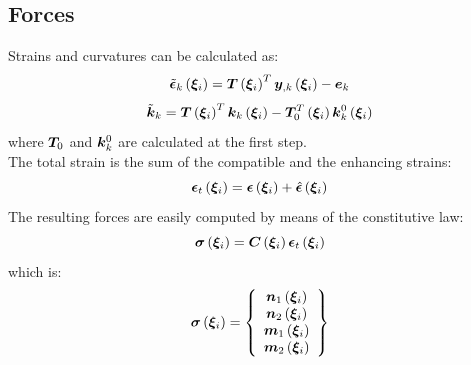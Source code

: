 \subsection{Forces}
Strains and curvatures can be calculated as:
\begin{equation}
\tilde{\T{\epsilon}}_k \valxii  =
\TT{T} \valxii ^T \T{y}_{,k} \valxii - \T{e}_k
\end{equation}
\begin{equation}
\tilde{\T{k}}_k  =
\TT{T} \valxii ^ T \T{k}_k \valxii - \TT{T}_0 ^ T \valxii \T{k}^{0}_{k} \valxii
\end{equation}
where $\TT{T}_0$ and $\T{k}^{0}_{k}$ are calculated at the first step.\\
The total strain is the sum of the compatible and the enhancing strains:
\begin{equation}
\T{\epsilon}_t \valxii =
\T{\epsilon} \valxii +
\hat{ \T{\epsilon} } \valxii
\end{equation}
The resulting forces are easily computed by means of the constitutive law:
\begin{equation}
\T{\sigma} \valxii =
\TT{C}\valxii \T{\epsilon}_t \valxii
\end{equation}
which is:
\begin{equation}
\T{\sigma} \valxii =
\cubr{\vvect{c}{
\T{n}_1 \valxii \\
\T{n}_2 \valxii \\
\T{m}_1 \valxii \\
\T{m}_2 \valxii
}}
\end{equation}
